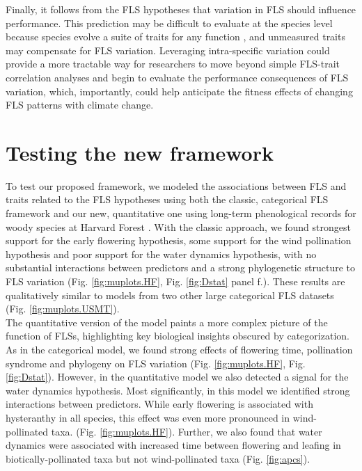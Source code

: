 \documentclass{article}
\begin{document}
\noindent Finally, it follows from the FLS hypotheses that variation in FLS should influence performance. This prediction may be difficult to evaluate at the species level because species evolve a suite of traits for any function \citep{Davies2019}, and unmeasured traits may compensate for FLS variation. Leveraging intra-specific variation could provide a more tractable way for researchers to move beyond simple FLS-trait correlation analyses and begin to evaluate the performance consequences of FLS variation, which, importantly, could help anticipate the fitness effects of changing FLS patterns with climate change.\\



\section*{Testing the new framework}

To test our proposed framework, we modeled the associations between FLS and traits related to the FLS hypotheses using both the classic, categorical FLS framework and our new, quantitative one using long-term phenological records for woody species at Harvard Forest \citep{OKeefe2015}. With the classic approach, we found strongest support for the early flowering hypothesis, some support for the wind pollination hypothesis and poor support for the water dynamics hypothesis, with no substantial interactions between predictors and a strong phylogenetic structure to FLS variation (Fig. \ref{fig:muplots.HF}, Fig.  \ref{fig:Dstat} panel f.). These results are qualitatively similar to models from two other large categorical FLS datasets (Fig. \ref{fig:muplots.USMT}). \\

\noindent The quantitative version of the model paints a more complex picture of the function of FLSs, highlighting key biological insights obscured by categorization. As in the categorical model, we found strong effects of flowering time, pollination syndrome and phylogeny on FLS variation (Fig. \ref{fig:muplots.HF}, Fig. \ref{fig:Dstat}). However, in the quantitative model we also detected a signal for the water dynamics hypothesis. %
Most significantly, in this model we identified strong interactions between predictors. While early flowering is associated with hysteranthy in all species, this effect was even more pronounced in wind-pollinated taxa. (Fig. \ref{fig:muplots.HF}). Further, we also found that water dynamics were associated with increased time between flowering and leafing in biotically-pollinated taxa but not wind-pollinated taxa (Fig. \ref{fig:apcs}). \\ 
\end{document}
